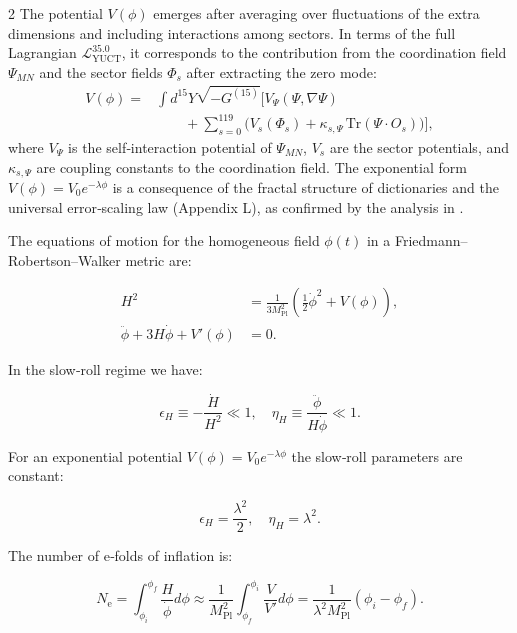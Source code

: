 \documentclass[12pt,a4paper]{article}
\newcommand{\Mpl}{M_{\mathrm{Pl}}}
\newcommand{\ninf}{N_{\mathrm{e}}}
\begin{document}
\begin{multicols}{2}
		The potential \(V(\phi)\) emerges after averaging over fluctuations of the extra dimensions and including interactions among sectors. In terms of the full Lagrangian \(\mathcal{L}_{\text{YUCT}}^{35.0}\), it corresponds to the contribution from the coordination field \(\Psi_{MN}\) and the sector fields \(\Phi_s\) after extracting the zero mode:
		\begin{align}
			V(\phi) = &\int d^{15}Y \sqrt{-G^{(15)}} \Big[ V_{\Psi}(\Psi,\nabla\Psi) \nonumber\\
			&\qquad + \sum_{s=0}^{119} \big( V_s(\Phi_s) + \kappa_{s,\Psi}\,\mathrm{Tr}(\Psi\cdot O_s) \big) \Big],
		\end{align}
		where \(V_{\Psi}\) is the self‑interaction potential of \(\Psi_{MN}\), \(V_s\) are the sector potentials, and \(\kappa_{s,\Psi}\) are coupling constants to the coordination field. The exponential form \(V(\phi)=V_0 e^{-\lambda\phi}\) is a consequence of the fractal structure of dictionaries and the universal error‑scaling law (Appendix L), as confirmed by the analysis in \cite{Yakushev2026}.
		
		The equations of motion for the homogeneous field \(\phi(t)\) in a Friedmann–Robertson–Walker metric are:
		
		\begin{align}
			H^2 &= \frac{1}{3\Mpl^2} \left( \frac{1}{2}\dot{\phi}^2 + V(\phi) \right), \label{eq:friedman1} \\
			\ddot{\phi} + 3H\dot{\phi} + V'(\phi) &= 0. \label{eq:field}
		\end{align}
		
		In the slow‑roll regime we have:
		
		\begin{equation}
			\epsilon_H \equiv -\frac{\dot{H}}{H^2} \ll 1, \quad \eta_H \equiv \frac{\ddot{\phi}}{H\dot{\phi}} \ll 1.
		\end{equation}
		
		For an exponential potential \(V(\phi) = V_0 e^{-\lambda \phi}\) the slow‑roll parameters are constant:
		
		\begin{equation}
			\epsilon_H = \frac{\lambda^2}{2}, \quad \eta_H = \lambda^2.
			\label{eq:slowroll}
		\end{equation}
		
		The number of e‑folds of inflation is:
		
		\begin{equation}
			\ninf = \int_{\phi_i}^{\phi_f} \frac{H}{\dot{\phi}} d\phi \approx \frac{1}{\Mpl^2} \int_{\phi_f}^{\phi_i} \frac{V}{V'} d\phi = \frac{1}{\lambda^2 \Mpl^2} (\phi_i - \phi_f).
		\end{equation}
		

\end{multicols}
\end{document}
